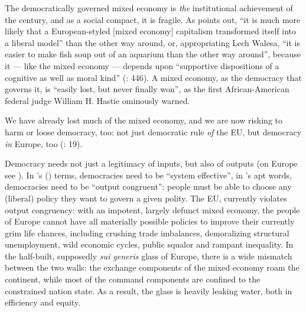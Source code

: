 \documentclass[11pt,a4paper,oneside,openright]{article}
\begin{document}
The democratically governed mixed economy is \emph{the} institutional achievement of the century, and as a social compact, it is fragile. As \citeauthor{Offe2003} points out, ``it is much more likely that a European-styled [mixed economy] capitalism transformed itself into a liberal model'' than the other way around, or, appropriating Lech Walesa, ``it is easier to make fish soup out of an aquarium than the other way around'', because it --- like the mixed economy --- depends upon ``supportive dispositions of a cognitive as well as moral kind'' (\citeyear{Offe2003}: 446). A mixed economy, as the democracy that governs it, is ``easily lost, but never finally won'', as the first African-American federal judge William H. Hastie ominously warned. 

We have already lost much of the mixed economy, and we are now risking to harm or loose democracy, too: not just democratic rule \emph{of} the \gls{EU}, but democracy \emph{in} Europe, too (\citealt{Scharpf1997}: 19).

Democracy needs not just a legitimacy of inputs, but also of outputs (on Europe see \citealt{SchaGove1999}). In \citeauthor{Dahl-1994-ab}'s (\citeyear{Dahl-1994-ab}) terms, democracies need to be ``system effective'', in \citeauthor{Zurn-2000-aa}'s \citeyearpar{Zurn-2000-aa} apt words, democracies need to be ``output congruent'': people must be able to choose any (liberal) policy they want to govern a given polity. The \gls{EU}, currently violates output congruency: with an impotent, largely defunct mixed economy, the people of Europe cannot have all materially possible policies to improve their currently grim life chances, including crushing trade imbalances, demoralizing structural unemployment, wild economic cycles, public squalor and rampant inequality. In the half-built, supposedly \emph{sui generis} glass of Europe, there is a wide mismatch between the two walls: the exchange components of the mixed economy roam the continent, while most of the command components are confined to the constrained nation state. As a result, the glass is heavily leaking water, both in efficiency and equity.
\end{document}
